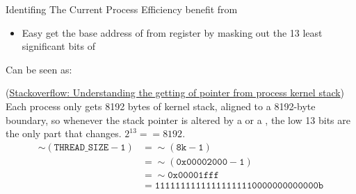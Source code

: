 \begin{frame}{Identifing The Current Process}
    Efficiency benefit from 
    \begin{itemize}
    \item Easy get the base address of  from  register by
      masking out the 13 least significant bits of 
    \end{itemize}
    \begin{block}{}
      \begin{center}
         
      \end{center}
      Can be seen as:
      \begin{center}
         
      \end{center}
    \end{block}
\end{frame}

(\href{http://stackoverflow.com/questions/11961490/understanding-the-getting-of-task-struct-pointer-from-process-kernel-stack}{Stackoverflow:
  Understanding the getting of  pointer from process kernel stack}) Each
process only gets 8192 bytes of kernel stack, aligned to a 8192-byte boundary, so whenever
the stack pointer is altered by a  or a , the low 13 bits are the
only part that changes. $2^{13} == 8192$.
\begin{equation*}
  \begin{split}
    \sim(\mathtt{THREAD\_SIZE - 1}) &= \sim(\mathtt{8k - 1}) \\
    &= \sim(\mathtt{0x00002000 - 1}) \\
    &= \sim\mathtt{0x00001fff} \\
    &= \mathtt{11111111111111111110000000000000b}
  \end{split}
\end{equation*}


